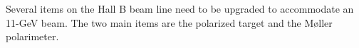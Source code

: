 Several items on the Hall B beam line need to be upgraded to accommodate
an 11-GeV beam. The two main items are the polarized target and the 
M{\o}ller polarimeter.
